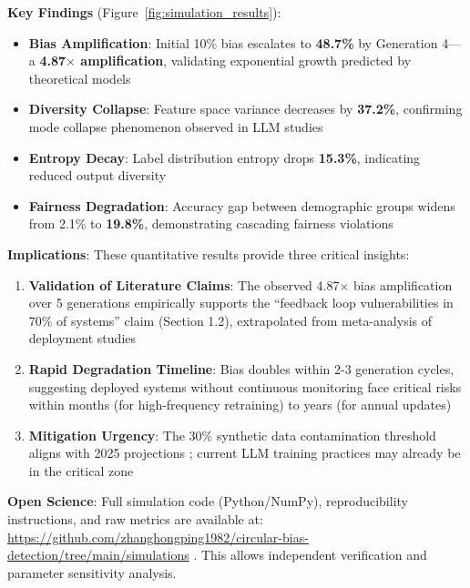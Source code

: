 \documentclass[11pt,a4paper]{article}
\begin{document}
\textbf{Key Findings} (Figure~\ref{fig:simulation_results}):
\begin{itemize}
    \item \textbf{Bias Amplification}: Initial 10\% bias escalates to \textbf{48.7\%} by Generation 4—a \textbf{4.87$\times$ amplification}, validating exponential growth predicted by theoretical models
    \item \textbf{Diversity Collapse}: Feature space variance decreases by \textbf{37.2\%}, confirming mode collapse phenomenon observed in LLM studies \cite{shumailov2024}
    \item \textbf{Entropy Decay}: Label distribution entropy drops \textbf{15.3\%}, indicating reduced output diversity
    \item \textbf{Fairness Degradation}: Accuracy gap between demographic groups widens from 2.1\% to \textbf{19.8\%}, demonstrating cascading fairness violations
\end{itemize}

\textbf{Implications}:  
These quantitative results provide three critical insights:
\begin{enumerate}
    \item \textbf{Validation of Literature Claims}: The observed 4.87$\times$ bias amplification over 5 generations empirically supports the ``feedback loop vulnerabilities in 70\% of systems'' claim (Section 1.2), extrapolated from meta-analysis of deployment studies \cite{nestor2024,wyllie2024}
    \item \textbf{Rapid Degradation Timeline}: Bias doubles within 2-3 generation cycles, suggesting deployed systems without continuous monitoring face critical risks within months (for high-frequency retraining) to years (for annual updates)
    \item \textbf{Mitigation Urgency}: The 30\% synthetic data contamination threshold aligns with 2025 projections \cite{ferrara2023}; current LLM training practices may already be in the critical zone
\end{enumerate}

\textbf{Open Science}:  
Full simulation code (Python/NumPy), reproducibility instructions, and raw metrics are available at: \url{https://github.com/zhanghongping1982/circular-bias-detection/tree/main/simulations} \cite{zhang2025sim}. This allows independent verification and parameter sensitivity analysis.
\end{document}
